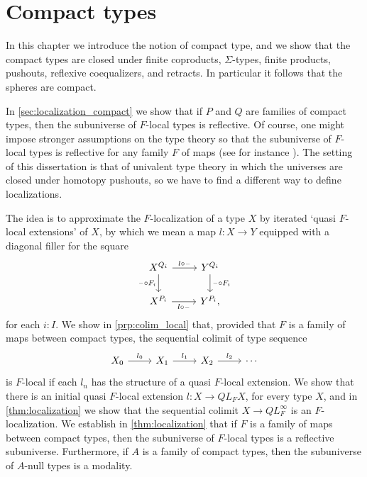 \chapter{Compact types}\label{chap:compact}

In this chapter we introduce the notion of compact type, and we show that the compact types are closed under finite coproducts, $\Sigma$-types, finite products, pushouts, reflexive coequalizers, and retracts. In particular it follows that the spheres are compact.

In \cref{sec:localization_compact} we show that if $P$ and $Q$ are families of compact types, then the subuniverse of $F$-local types is reflective. Of course, one might impose stronger assumptions on the type theory so that the subuniverse of $F$-local types is reflective for any family $F$ of maps (see for instance \cite{RijkeShulmanSpitters}). The setting of this dissertation is that of univalent type theory in which the universes are closed under homotopy pushouts, so we have to find a different way to define localizations.

The idea is to approximate the $F$-localization of a type $X$ by iterated `quasi $F$-local extensions' of $X$, by which we mean a map $l:X\to Y$ equipped with a diagonal filler for the square
\begin{equation*}
\begin{tikzcd}
X^{Q_i} \arrow[r,"l\circ\blank"] \arrow[d,swap,"\blank\circ F_i"] & Y^{Q_i} \arrow[d,"\blank\circ F_i"] \\
X^{P_i} \arrow[r,swap,"l\circ \blank"] & Y^{P_i},
\end{tikzcd}
\end{equation*}
for each $i:I$. We show in \cref{prp:colim_local} that, provided that $F$ is a family of maps between compact types, the sequential colimit of type sequence
\begin{equation*}
\begin{tikzcd}
X_0 \arrow[r,"l_0"] & X_1 \arrow[r,"l_1"] & X_2 \arrow[r,"l_2"] & \cdots
\end{tikzcd}
\end{equation*}
is $F$-local if each $l_n$ has the structure of a quasi $F$-local extension. We show that there is an initial quasi $F$-local extension $l:X\to QL_F X$, for every type $X$, and in \cref{thm:localization} we show that the sequential colimit $X\to QL_F^\infty$ is an $F$-localization. We establish in \cref{thm:localization} that if $F$ is a family of maps between compact types, then the subuniverse of $F$-local types is a reflective subuniverse. Furthermore, if $A$ is a family of compact types, then the subuniverse of $A$-null types is a modality.

